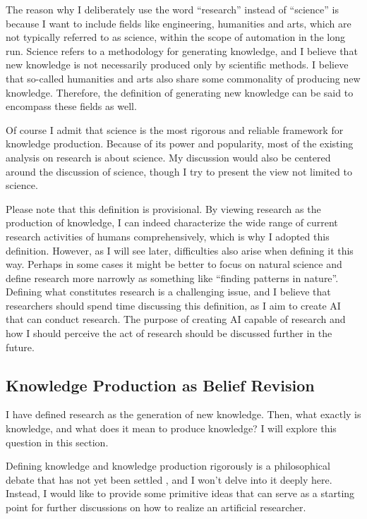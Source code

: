 
The reason why I deliberately use the word ``research'' instead of ``science'' is because I want to include fields like engineering, humanities and arts, which are not typically referred to as science, within the scope of automation in the long run. Science refers to a methodology for generating knowledge, and I believe that new knowledge is not necessarily produced only by scientific methods. I believe that so-called humanities and arts also share some commonality of producing new knowledge. Therefore, the definition of generating new knowledge can be said to encompass these fields as well.

Of course I admit that science is the most rigorous and reliable framework for knowledge production. Because of its power and popularity, most of the existing analysis on research is about science. My discussion would also be centered around the discussion of science, though I try to present the view not limited to science. 

Please note that this definition is provisional. By viewing research as the production of knowledge, I can indeed characterize the wide range of current research activities of humans comprehensively, which is why I adopted this definition. However, as I will see later, difficulties also arise when defining it this way. Perhaps in some cases it might be better to focus on natural science and define research more narrowly as something like ``finding patterns in nature''. Defining what constitutes research is a challenging issue, and I believe that researchers should spend time discussing this definition, as I aim to create AI that can conduct research. The purpose of creating AI capable of research and how I should perceive the act of research should be discussed further in the future.

\subsection{Knowledge Production as Belief Revision}
I have defined research as the generation of new knowledge. Then, what exactly is knowledge, and what does it mean to produce knowledge? I will explore this question in this section. 

Defining knowledge and knowledge production rigorously is a philosophical debate that has not yet been settled \cite{sep-epistemology}, and I won't delve into it deeply here. Instead, I would like to provide some primitive ideas that can serve as a starting point for further discussions on how to realize an artificial researcher.

